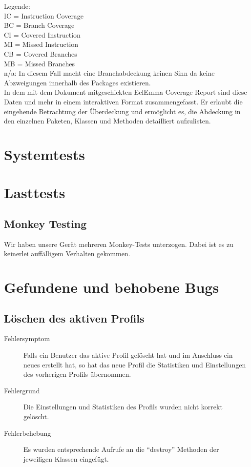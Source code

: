 \documentclass[parskip=full]{scrreprt}
\begin{document}
Legende: \\
	IC = Instruction Coverage \\
	BC = Branch Coverage \\
	CI = Covered Instruction \\
	MI = Missed Instruction \\
	CB = Covered Branches \\
	MB = Missed Branches \\
	n/a: In diesem Fall macht eine Branchabdeckung keinen Sinn da keine Abzweigungen innerhalb des Packages existieren. \\

In dem mit dem Dokument mitgeschickten EclEmma Coverage Report sind diese Daten und mehr in einem interaktiven Format zusammengefasst. 
Er erlaubt die eingehende Betrachtung der Überdeckung und ermöglicht es, die Abdeckung in den einzelnen Paketen, Klassen und Methoden detailliert aufzulisten.

\chapter{Systemtests}

\chapter{Lasttests}

\section{Monkey Testing}

Wir haben unsere Gerät mehreren Monkey-Tests unterzogen. Dabei ist es zu keinerlei auffälligem Verhalten gekommen.

\chapter{Gefundene und behobene Bugs}

\section{Löschen des aktiven Profils}
\begin{description}
	\item[Fehlersymptom] Falls ein Benutzer das aktive Profil gelöscht hat und im Anschluss ein neues erstellt hat, so hat das neue Profil die Statistiken und Einstellungen des vorherigen Profils übernommen.
	\item[Fehlergrund] Die Einstellungen und Statistiken des Profils wurden nicht korrekt gelöscht.
	\item[Fehlerbehebung] Es wurden entsprechende Aufrufe an die \enquote{destroy} Methoden der jeweiligen Klassen eingefügt.
\end{description}
\end{document}
